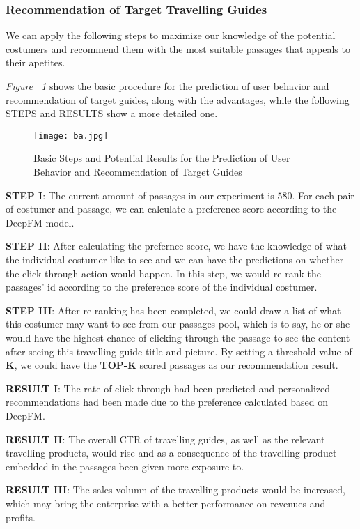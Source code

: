 \documentclass{article}
\begin{document}
    \subsubsection{Recommendation of Target Travelling Guides}
    We can apply the following steps to maximize our knowledge of the potential costumers and recommend them with the most suitable passages that appeals to their apetites. 

    \emph{Figure ~\ref{fig:ba}} shows the basic procedure for the prediction of user behavior and recommendation of target guides, along with the advantages, while the following STEPS and RESULTS show a more detailed one.
    
    \begin{figure}[!h]
		\centering
		\texttt{[image: ba.jpg]}
		\caption{\small{Basic Steps and Potential Results for the Prediction of User Behavior and Recommendation of Target Guides}}
		\label{fig:ba}
	\end{figure}

    \textbf{STEP I}: The current amount of passages in our experiment is $580$. For each pair of costumer and passage, we can calculate a preference score according to the DeepFM model.

    \textbf{STEP II}: After calculating the prefernce score, we have the knowledge of what the individual costumer like to see and we can have the predictions on whether the click through action would happen. In this step, we would re-rank the passages' id according to the preference score of the individual costumer.

    \textbf{STEP III}: After re-ranking has been completed, we could draw a list of what this costumer may want to see from our passages pool, which is to say, he or she would have the highest chance of clicking through the passage to see the content after seeing this travelling guide title and picture. By setting a threshold value of \textbf{K}, we could have the \textbf{TOP-K} scored passages as our recommendation result.

    \textbf{RESULT I}: The rate of click through had been predicted and personalized recommendations had been made due to the preference calculated based on DeepFM. 

    \textbf{RESULT II}: The overall CTR of travelling guides, as well as the relevant travelling products, would rise and as a consequence of the travelling product embedded in the passages been given more exposure to.

    \textbf{RESULT III}: The sales volumn of the travelling products would be increased, which may bring the enterprise with a better performance on revenues and profits. 
\end{document}
